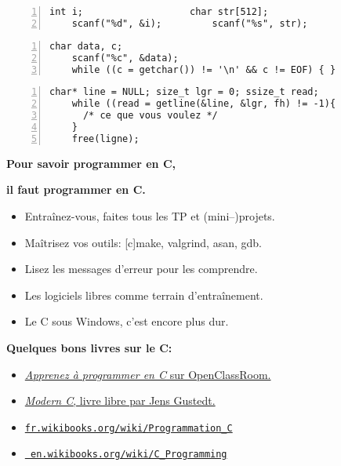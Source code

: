 \documentclass[a4paper,10pt,landscape]{article}
\newcommand{\Subsection}[1]{{\textbf{#1}}}
\begin{document}
\begin{multicols}{3}

  \smallskip
  \begin{Verbatim}[label=Lire un entier ou une chaîne,
    gobble=4,frame=single,numbers=left,numbersep=2pt]
    int i;                   char str[512];
    scanf("%d", &i);         scanf("%s", str);
  \end{Verbatim}  
  \begin{Verbatim}[label=Lire un caractère et vider le buffer,
    gobble=4,frame=single,numbers=left,numbersep=2pt]
    char data, c;
    scanf("%c", &data);
    while ((c = getchar()) != '\n' && c != EOF) { }
  \end{Verbatim}  
  \begin{Verbatim}[label=Lecture d'un fichier ligne à ligne, gobble=4, frame=single,
    numbers=left,numbersep=2pt]
    char* line = NULL; size_t lgr = 0; ssize_t read;
    while ((read = getline(&line, &lgr, fh) != -1){
      /* ce que vous voulez */
    }
    free(ligne);
  \end{Verbatim}  


  \centerline{\bf\large Pour savoir programmer en C,}
  \centerline{\bf\large il faut programmer en C.}
  \begin{itemize}[noitemsep]
  \item Entraînez-vous, faites tous les TP et (mini--)projets.
  \item Maîtrisez vos outils: [c]make, valgrind, asan, gdb.
  \item Lisez les messages d'erreur pour les comprendre.
  \item Les logiciels libres comme terrain d'entraînement.
  \item Le C sous Windows, c'est encore plus dur.
  \end{itemize}
  \vspace{-.2\baselineskip}

  \Subsection{Quelques bons livres sur le C:}
  \begin{itemize}[noitemsep,nolistsep]
  \item
    \href{https://openclassrooms.com/courses/apprenez-a-programmer-en-c}
    {{\it Apprenez à programmer en C} sur OpenClassRoom.}
  \item
    \href{http://icube-icps.unistra.fr/index.php/File:ModernC.pdf}
      {{\it Modern C}, livre libre par Jens Gustedt.}
  \item \href{https://fr.wikibooks.org/wiki/Programmation_C}{\tt fr.wikibooks.org/wiki/Programmation\_C}
  \item \href{https://en.wikibooks.org/wiki/C_Programming}{\tt
      en.wikibooks.org/wiki/C\_Programming}
     

\end{itemize}
\end{multicols}
\end{document}
